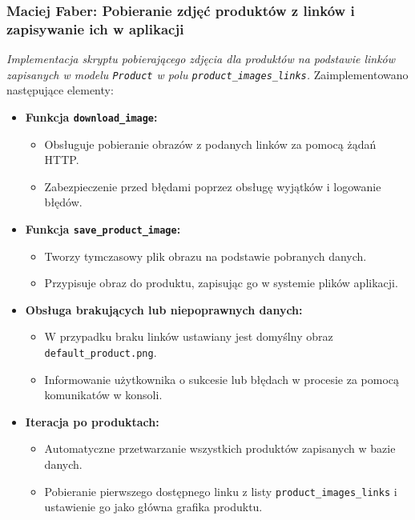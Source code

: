 \documentclass[12pt,a4paper,oneside]{article}
\theoremstyle{definition}
\numberwithin{equation}{section}
\begin{document}
\subsubsection{Maciej Faber: Pobieranie zdjęć produktów z linków i zapisywanie ich w aplikacji}
\label{section:1.3.43}
\textit{
Implementacja skryptu pobierającego zdjęcia dla produktów na podstawie linków zapisanych w modelu \texttt{Product} w polu \texttt{product\_images\_links}.
}
Zaimplementowano następujące elementy:
\begin{itemize}
    \item \textbf{Funkcja \texttt{download\_image}:}
    \begin{itemize}
        \item Obsługuje pobieranie obrazów z podanych linków za pomocą żądań HTTP.
        \item Zabezpieczenie przed błędami poprzez obsługę wyjątków i logowanie błędów.
    \end{itemize}
    \item \textbf{Funkcja \texttt{save\_product\_image}:}
    \begin{itemize}
        \item Tworzy tymczasowy plik obrazu na podstawie pobranych danych.
        \item Przypisuje obraz do produktu, zapisując go w systemie plików aplikacji.
    \end{itemize}
    \item \textbf{Obsługa brakujących lub niepoprawnych danych:}
    \begin{itemize}
        \item W przypadku braku linków ustawiany jest domyślny obraz \texttt{default\_product.png}.
        \item Informowanie użytkownika o sukcesie lub błędach w procesie za pomocą komunikatów w konsoli.
    \end{itemize}
    \item \textbf{Iteracja po produktach:}
    \begin{itemize}
        \item Automatyczne przetwarzanie wszystkich produktów zapisanych w bazie danych.
        \item Pobieranie pierwszego dostępnego linku z listy \texttt{product\_images\_links} i ustawienie go jako główna grafika produktu.
    \end{itemize}
\end{itemize}
\end{document}
